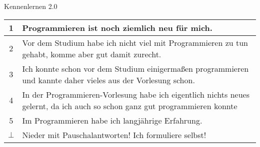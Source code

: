 


\morescalingdelimiters



	
	\section{}
	\aboutMeFrame
	
	\begin{frame}{Kennenlernen 2.0}
		\begin{tabular}{ | c | p{10.5cm} | }
			\hline
			1 & Programmieren ist noch ziemlich neu für mich. 
			\\ \hline
			2 & Vor dem Studium habe ich nicht viel mit Programmieren zu tun gehabt, komme aber gut damit zurecht.
			\\ \hline
			3 & Ich konnte schon vor dem Studium einigermaßen programmieren und kannte daher vieles aus der Vorlesung schon.
			\\ \hline
			4 & In der Programmieren-Vorlesung habe ich eigentlich nichts neues gelernt, da ich auch so schon ganz gut programmieren konnte
			\\ \hline
			5 & Im Programmieren habe ich langjährige Erfahrung.
			\\ \hline
			$\bot$ & Nieder mit Pauschalantworten! Ich formuliere selbst!
			\\ \hline
		\end{tabular}
	\end{frame}
	
	
